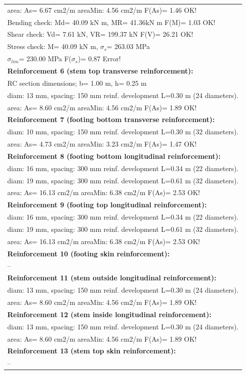 \begin{center}
\begin{supertabular}[H]{|l|}
  area: As=   6.67 cm2/m areaMin:   4.56 cm2/m  F(As)= 1.46 OK!\\
  Bending check: Md=  40.09 kN m, MR=  41.36kN m  F(M)= 1.03 OK!\\
  Shear check: Vd=   7.61 kN,  VR= 199.37 kN  F(V)= 26.21 OK!\\
  Stress check: M=  40.09 kN m, $\sigma_s$= 263.03 MPa\\
    $\sigma_{lim}$= 230.00 MPa  F($\sigma_s$)= 0.87 Error!\\
\textbf{Reinforcement 6 (stem top transverse reinforcement):}\\
  RC section dimensions; b= 1.00 m, h= 0.25 m\\
  diam: 13 mm, spacing: 150 mm  reinf. development L=0.30 m (24 diameters).\\
  area: As=   8.60 cm2/m areaMin:   4.56 cm2/m  F(As)= 1.89 OK!\\
\textbf{Reinforcement 7 (footing bottom transverse reinforcement):}\\
  diam: 10 mm, spacing: 150 mm  reinf. development L=0.30 m (32 diameters).\\
  area: As=   4.73 cm2/m areaMin:   3.23 cm2/m  F(As)= 1.47 OK!\\
\textbf{Reinforcement 8 (footing bottom longitudinal reinforcement):}\\
  diam: 16 mm, spacing: 300 mm  reinf. development L=0.34 m (22 diameters).\\
  diam: 19 mm, spacing: 300 mm  reinf. development L=0.61 m (32 diameters).\\
  area: As=  16.13 cm2/m areaMin:   6.38 cm2/m  F(As)= 2.53 OK!\\
\textbf{Reinforcement 9 (footing top longitudinal reinforcement):}\\
  diam: 16 mm, spacing: 300 mm  reinf. development L=0.34 m (22 diameters).\\
  diam: 19 mm, spacing: 300 mm  reinf. development L=0.61 m (32 diameters).\\
  area: As=  16.13 cm2/m areaMin:   6.38 cm2/m  F(As)= 2.53 OK!\\
\textbf{Reinforcement 10 (footing skin reinforcement):}\\
  --\\
\textbf{Reinforcement 11 (stem outside longitudinal reinforcement):}\\
  diam: 13 mm, spacing: 150 mm  reinf. development L=0.30 m (24 diameters).\\
  area: As=   8.60 cm2/m areaMin:   4.56 cm2/m  F(As)= 1.89 OK!\\
\textbf{Reinforcement 12 (stem inside longitudinal reinforcement):}\\
  diam: 13 mm, spacing: 150 mm  reinf. development L=0.30 m (24 diameters).\\
  area: As=   8.60 cm2/m areaMin:   4.56 cm2/m  F(As)= 1.89 OK!\\
\textbf{Reinforcement 13 (stem top skin reinforcement):}\\
  --\\
\hline
\end{supertabular}
\end{center}
